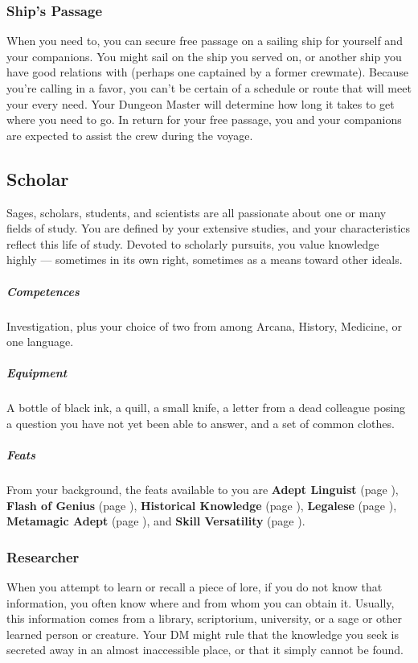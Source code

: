     \subsubsection{Ship's Passage}
        When you need to, you can secure free passage on a sailing ship for yourself and your companions.
        You might sail on the ship you served on, or another ship you have good relations with (perhaps one captained by a former crewmate).
        Because you're calling in a favor, you can't be certain of a schedule or route that will meet your every need.
        Your Dungeon Master will determine how long it takes to get where you need to go.
        In return for your free passage, you and your companions are expected to assist the crew during the voyage.

\subsection*{Scholar} \label{ssec::scholar}
    Sages, scholars, students, and scientists are all passionate about one or many fields of study.
    You are defined by your extensive studies, and your characteristics reflect this life of study.
    Devoted to scholarly pursuits, you value knowledge highly --- sometimes in its own right, sometimes as a means toward other ideals.

    \subparagraph{Competences} Investigation, plus your choice of two from among Arcana, History, Medicine, or one language.

    \subparagraph{Equipment} A bottle of black ink, a quill, a small knife, a letter from a dead colleague posing a question you have not yet been able to answer, and a set of common clothes.

    \subparagraph{Feats} From your background, the feats available to you are
    \textbf{Adept Linguist} (page \pageref{feat::adeptlinguist}),
    \textbf{Flash of Genius} (page \pageref{feat::flashofgenius}),
    \textbf{Historical Knowledge} (page \pageref{feat::historicalknowledge}),
    \textbf{Legalese} (page \pageref{feat::legalese}),
    \textbf{Metamagic Adept} (page \pageref{feat::metamagicadept}), and
    \textbf{Skill Versatility} (page \pageref{feat::skillversatility}).

    \subsubsection{Researcher} \label{feat::researcher}
        When you attempt to learn or recall a piece of lore, if you do not know that information, you often know where and from whom you can obtain it.
        Usually, this information comes from a library, scriptorium, university, or a sage or other learned person or creature.
        Your DM might rule that the knowledge you seek is secreted away in an almost inaccessible place, or that it simply cannot be found.

